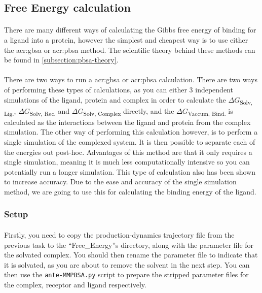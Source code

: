 \subsection{Free Energy calculation}
    \paragraph{}
    There are many different ways of calculating the Gibbs free energy of binding for a ligand into a protein\cite{Cournia2017RelativeConsiderations, Genheden2012ComparisonEnergies, Singh2010AbsoluteInteractions, P.Bhati2016RapidIntegration, Wang2019End-PointDesign}, however the simplest and cheapest way is to use either the \gls{acr:gbsa} or \gls{acr:pbsa} method.\cite{Wang2019End-PointDesign} The scientific theory behind these methods can be found in \cref{subsection:pbsa-theory}.

    \paragraph{}
    There are two ways to run a \gls{acr:gbsa}  or \gls{acr:pbsa} calculation. There are two ways of performing these types of calculations, as you can either 3 independent simulations of the ligand, protein and complex in order to calculate the $\Delta G$\textsubscript{Solv, Lig.}, $\Delta G$\textsubscript{Solv, Rec.} and $\Delta G$\textsubscript{Solv, Complex} directly, and the $\Delta G$\textsubscript{Vaccum, Bind.} is calculated as the interactions between the ligand and protein from the complex simulation. The other way of performing this calculation however, is to perform a single simulation of the complexed system. It is then possible to separate each of the energies out post-hoc. Advantages of this method are that it only requires a single simulation, meaning it is much less computationally intensive so you can potentially run a longer simulation. This type of calculation also has been shown to increase accuracy. Due to the ease and accuracy of the single simulation method, we are going to use this for calculating the binding energy of the ligand. 

    \subsubsection{Setup}
    \paragraph{}
    Firstly, you need to copy the production-dynamics trajectory file from the previous task to the \enquote{Free\_Energy}s directory, along with the parameter file for the solvated complex. You should then rename the parameter file to indicate that it is solvated, as you are about to remove the solvent in the next step. You can then use the \texttt{ante-MMPBSA.py} script to prepare the stripped parameter files for the complex, receptor and ligand respectively. 
    
